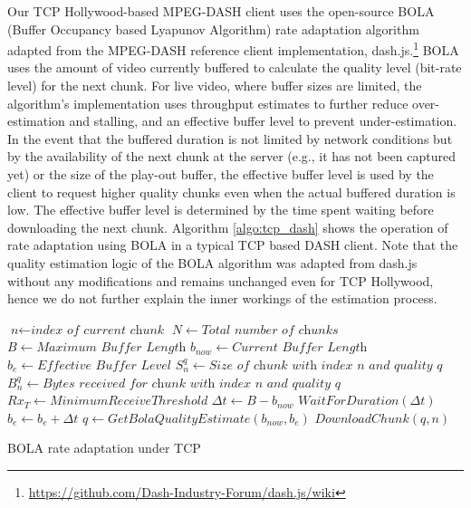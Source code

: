 Our TCP Hollywood-based MPEG-DASH client uses the open-source BOLA 
(Buffer Occupancy based Lyapunov Algorithm) rate adaptation algorithm \cite{spiteri2016bola} adapted from the MPEG-DASH reference
client implementation, dash.js.\footnote{\url{https://github.com/Dash-Industry-Forum/dash.js/wiki}}
BOLA uses the amount of video currently buffered to calculate the quality level (bit-rate
level) for the next chunk. For live video, where buffer sizes are limited, the algorithm's implementation 
uses throughput estimates to further reduce over-estimation and stalling, and an effective buffer level to prevent under-estimation. In the event that the buffered duration is not limited by network conditions but by the availability of the next chunk at the server (e.g., it has not been captured yet) or the size of the play-out buffer, the effective buffer level is used by the client to request higher quality chunks even when the actual buffered duration is low. The effective buffer level is determined by the time spent waiting before downloading the next chunk. Algorithm \ref{algo:tcp_dash} shows the operation of rate adaptation using BOLA in a typical TCP based DASH client. Note that the quality estimation logic of the BOLA algorithm was adapted from dash.js without any modifications and remains unchanged even for TCP Hollywood, hence we do not further explain the inner workings of the estimation process. 


\begin{algorithm}[t!]
	\begin{algorithmic}[1]
		\State $\textit{n} \gets \textit{index of current chunk}$
		\State $N \gets \textit{Total number of chunks}$
		\State $B \gets \textit{Maximum Buffer Length}$
		\State $b_{now} \gets \textit{Current Buffer Length}$
		\State $b_{e} \gets \textit{Effective Buffer Level}$
		\State $S_n^q \gets \textit{Size of chunk with index n and quality q}$
		\State $B_n^q  \gets \textit{Bytes received for chunk with index n and quality q }$
		\State $Rx_T \gets Minimum Receive Threshold$
				\State $\Delta t \gets B - b_{now}$
				\State $WaitForDuration (\Delta t)$
			\EndIf
			\State $b_{e} \gets b_{e} + \Delta t$
			\State ${q \gets GetBolaQualityEstimate(b_{now},  b_{e})}$
			\State ${DownloadChunk(q, n)}$
		\EndWhile
		\EndProcedure
	\end{algorithmic}
	\caption{BOLA rate adaptation under TCP}
    	\label{algo:tcp_dash}
\end{algorithm}

